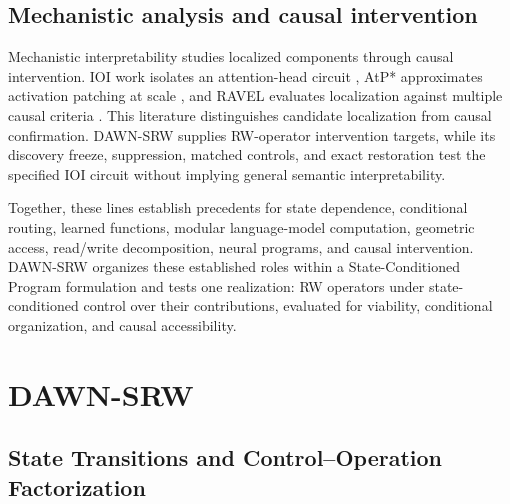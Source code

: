 \documentclass{article}
\newcommand{\DAWN}{DAWN-SRW}
\begin{document}
\subsection{Mechanistic analysis and causal intervention}

Mechanistic interpretability studies localized components through causal
intervention. IOI work isolates an attention-head circuit
\cite{wang2023interpretability}, AtP* approximates activation patching at scale
\cite{kramar2024atp}, and RAVEL evaluates localization against multiple causal
criteria \cite{huang2024ravel}. This literature distinguishes candidate
localization from causal confirmation. \DAWN{} supplies RW-operator intervention
targets, while its discovery freeze, suppression, matched controls, and exact
restoration test the specified IOI circuit without implying general semantic
interpretability.

Together, these lines establish precedents for state dependence, conditional
routing, learned functions, modular language-model computation, geometric
access, read/write decomposition, neural programs, and causal intervention.
\DAWN{} organizes these established roles within a State-Conditioned Program
formulation and tests one realization: RW operators under state-conditioned
control over their contributions, evaluated for viability, conditional
organization, and causal accessibility.

\section{DAWN-SRW}
\label{sec:method}

\subsection{State Transitions and Control--Operation Factorization}
\label{sec:state-transitions}
\label{sec:transition-hypothesis}
\end{document}
